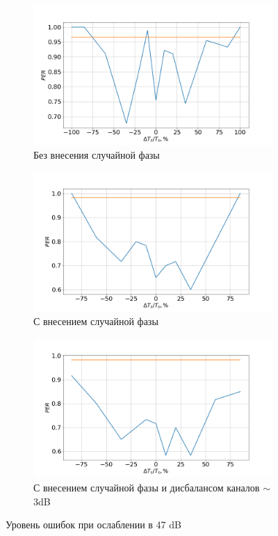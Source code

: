 \documentclass[a4paper,12pt,oneside]{scrartcl}
\begin{document}
\begin{figure}[!h]
	\centering
	\begin{subfigure}[h]{0.7\linewidth}
		\includegraphics[width=\textwidth]{pics/Timing4711.png}
		\caption{Без внесения случайной фазы}
		\label{fig:Timing47no}
	\end{subfigure}
	\begin{subfigure}[h]{0.7\linewidth}
		\includegraphics[width=\textwidth]{pics/Timing4721.png}
		\caption{С внесением случайной фазы}
		\label{fig:Timing47yes}
	\end{subfigure}
	\begin{subfigure}[h]{0.7\linewidth}
		\includegraphics[width=\textwidth]{pics/Timing4731.png}
		\caption{С внесением случайной фазы и дисбалансом каналов $\sim$ 3dB}
		\label{fig:Timing47disb}
	\end{subfigure}
	\caption{Уровень ошибок при ослаблении в 47 dB}
	\label{fig:Timing47}
\end{figure}
\FloatBarrier
\end{document}
